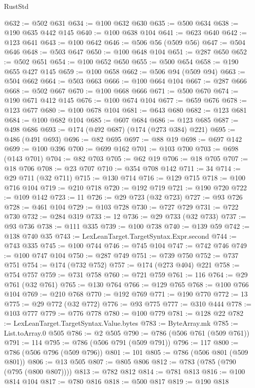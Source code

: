 \begin{lexlean}{RustStd}
\begin{coremodule}
@632 := @502 @631
@634 := @100 @632 @630
@635 := @500 @634
@638 := @190 @635 @442 @145
@640 := @100 @638 @104
@641 := @623 @640
@642 := @123 @641
@643 := @100 @642
@646 := @506 @56 (@509 @56)
@647 := @504 @646
@648 := @503 @647
@650 := @100 @648 @104
@651 := @287 @650
@652 := @502 @651
@654 := @100 @652 @650
@655 := @500 @654
@658 := @190 @655 @427 @145
@659 := @100 @658
@662 := @506 @94 (@509 @94)
@663 := @504 @662
@664 := @503 @663
@666 := @100 @664 @104
@667 := @287 @666
@668 := @502 @667
@670 := @100 @668 @666
@671 := @500 @670
@674 := @190 @671 @412 @145
@676 := @100 @674 @104
@677 := @659 @676
@678 := @123 @677
@680 := @100 @678 @104
@681 := @643 @680
@682 := @123 @681
@684 := @100 @682 @104
@685 := @607 @684
@686 := @123 @685
@687 := @498 @686
@693 := @174 (@492 @687) (@174 (@273 @384) @221)
@695 := @486 (@491 @693)
@696 := @82 @695
@697 := @88 @19
@698 := @697 @142
@699 := @100 @396
@700 := @699 @162
@701 := @103 @700
@703 := @698 (@143 @701)
@704 := @82 @703
@705 := @62 @19
@706 := @18 @705
@707 := @18 @706
@708 := @23 @707
@710 := @354 @708 @142
@711 := 34
@714 := @29 @711 (@32 @711)
@715 := @130 @714
@716 := @129 @715
@718 := @100 @716 @104
@719 := @210 @718
@720 := @192 @719
@721 := @190 @720
@722 := @109 @142
@723 := 11
@726 := @29 @723 (@32 @723)
@727 := @93 @726
@728 := @461 @104
@729 := @103 @728
@730 := @727 @729
@731 := @722 @730
@732 := @284 @319
@733 := 12
@736 := @29 @733 (@32 @733)
@737 := @93 @736
@738 := @111 @335
@739 := @100 @738
@740 := @139 @59
@742 := @138 @740 @35
@743 := LexLeanTarget.TargetSyntax.Expr.second
@744 := @743 @335
@745 := @100 @744
@746 := @745 @104
@747 := @742 @746
@749 := @100 @747 @104
@750 := @287 @749
@751 := @739 @750
@752 := @737 @751
@754 := @174 (@732 @752)
@757 := @174 (@273 @404) @221
@758 := @754 @757
@759 := @731 @758
@760 := @721 @759
@761 := 116
@764 := @29 @761 (@32 @761)
@765 := @130 @764
@766 := @129 @765
@768 := @100 @766 @104
@769 := @210 @768
@770 := @192 @769
@771 := @190 @770
@772 := 13
@775 := @29 @772 (@32 @772)
@776 := @93 @775
@777 := @310 @444
@778 := @103 @777
@779 := @776 @778
@780 := @100 @779
@781 := @128 @22
@782 := LexLeanTarget.TargetSyntax.Value.bytes
@783 := ByteArray.mk
@785 := List.toArray.{0} @505
@786 := @2 @505
@790 := @786 (@506 @761 (@509 @761))
@791 := 114
@795 := @786 (@506 @791 (@509 @791))
@796 := 117
@800 := @786 (@506 @796 (@509 @796))
@801 := 101
@805 := @786 (@506 @801 (@509 @801))
@806 := @13 @505
@807 := @805 @806
@812 := @783 (@785 (@790 (@795 (@800 @807))))
@813 := @782 @812
@814 := @781 @813
@816 := @100 @814 @104
@817 := @780 @816
@818 := @500 @817
@819 := @190 @818

\end{coremodule}
\end{lexlean}
